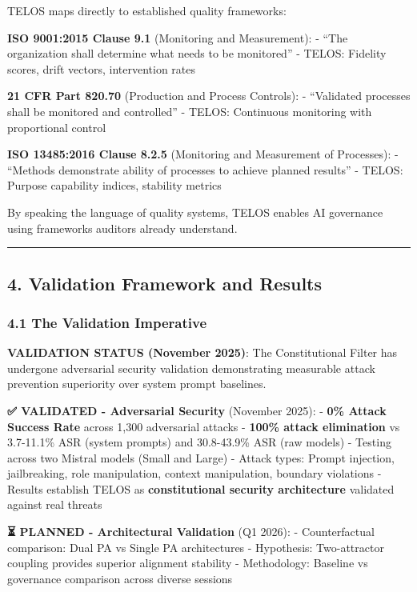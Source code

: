 TELOS maps directly to established quality frameworks:

\textbf{ISO 9001:2015 Clause 9.1} (Monitoring and Measurement): - ``The
organization shall determine what needs to be monitored'' - TELOS:
Fidelity scores, drift vectors, intervention rates

\textbf{21 CFR Part 820.70} (Production and Process Controls): -
``Validated processes shall be monitored and controlled'' - TELOS:
Continuous monitoring with proportional control

\textbf{ISO 13485:2016 Clause 8.2.5} (Monitoring and Measurement of
Processes): - ``Methods demonstrate ability of processes to achieve
planned results'' - TELOS: Purpose capability indices, stability metrics

By speaking the language of quality systems, TELOS enables AI governance
using frameworks auditors already understand.

\begin{center}\rule{0.5\linewidth}{0.5pt}\end{center}

\subsection{4. Validation Framework and
Results}\label{validation-framework-and-results}

\subsubsection{4.1 The Validation
Imperative}\label{the-validation-imperative}

\textbf{VALIDATION STATUS (November 2025)}: The Constitutional Filter
has undergone adversarial security validation demonstrating measurable
attack prevention superiority over system prompt baselines.

\textbf{✅ VALIDATED - Adversarial Security} (November 2025): -
\textbf{0\% Attack Success Rate} across 1,300 adversarial attacks -
\textbf{100\% attack elimination} vs 3.7-11.1\% ASR (system prompts) and
30.8-43.9\% ASR (raw models) - Testing across two Mistral models (Small
and Large) - Attack types: Prompt injection, jailbreaking, role
manipulation, context manipulation, boundary violations - Results
establish TELOS as \textbf{constitutional security architecture}
validated against real threats

\textbf{⏳ PLANNED - Architectural Validation} (Q1 2026): -
Counterfactual comparison: Dual PA vs Single PA architectures -
Hypothesis: Two-attractor coupling provides superior alignment stability
- Methodology: Baseline vs governance comparison across diverse sessions

